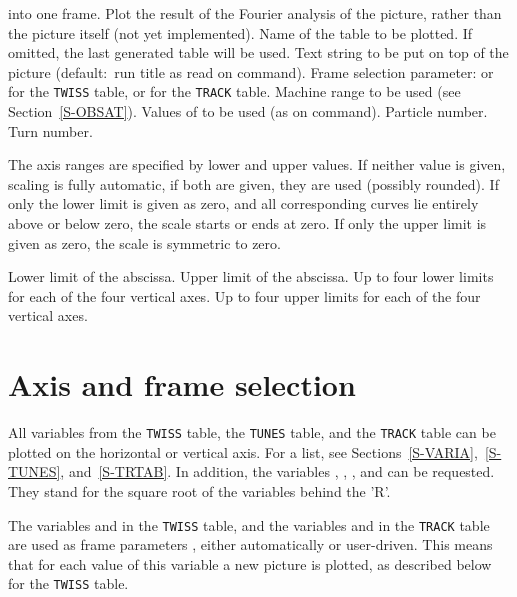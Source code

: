 \begin{mylist}
into one frame.
Plot the result of the Fourier analysis of the picture, rather than
the picture itself (not yet implemented).
Name of the table to be plotted.
If omitted, the last generated table will be used.
Text string to be put on top of the picture
(default:~run title as read on  command).
Frame selection parameter:  or  for the
{\tt TWISS} table,
 or  for the {\tt TRACK} table.
Machine range to be used (see Section~\ref{S-OBSAT}).
Values of  to be used (as on  command).
Particle number.
Turn number.
\end{mylist}
The axis ranges are specified by lower and upper values.
If neither value is given, scaling is fully automatic,
if both are given, they are used (possibly rounded).
If only the lower limit is given as zero,
and all corresponding curves lie entirely above or below zero,
the scale starts or ends at zero.
If only the upper limit is given as zero, the scale is symmetric to zero.
\begin{mylist}
Lower limit of the abscissa.
Upper limit of the abscissa.
Up to four lower limits for each of the four vertical axes.
Up to four upper limits for each of the four vertical axes.
\end{mylist}
 
\section{Axis and frame selection}
All variables from the {\tt TWISS} table, the {\tt TUNES} table,
and the {\tt TRACK} table can be plotted on the horizontal or vertical axis.
For a list, see Sections~\ref{S-VARIA},~\ref{S-TUNES},
and~\ref{S-TRTAB}.
In addition, the variables , , ,
and  can be requested. They stand for the square root
of the variables behind the 'R'.
 
The variables  and   in the {\tt TWISS} table, and
the variables  and  in the {\tt TRACK} table
are used as frame parameters , either automatically or
user-driven. This means that for each value of this  variable  a new
picture  is plotted, as described below for the {\tt TWISS} table.
 
